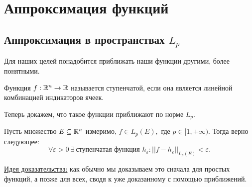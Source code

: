 \section{Аппроксимация функций}
\subsection{Аппроксимация в пространствах $L_p$}
Для наших целей понадобится приближать наши функции другими, более понятными.

\begin{definition}
    Функция $f : \mathbb{R}^{n} \rightarrow \mathbb{R}$ называется ступенчатой, если она является линейной комбинацией индикаторов ячеек.
\end{definition}

Теперь докажем, что такое функции приближают по норме $L_p$.

\begin{theorem}
    Пусть множество $E \subseteq \mathbb{R}^n$ измеримо, $f \in L_p(E), $ где $p \in [1, +\infty)$.
    Тогда верно следующее:
    $$\forall \varepsilon > 0 \ \exists \ \text{ступенчатая функция } h_{\varepsilon} : ||f - h_{\varepsilon}||_{L_p(E)} < \varepsilon.$$
\end{theorem}

\underline{Идея доказательства:} как обычно мы доказываем это сначала для простых функций, а позже для всех, сводя к уже доказанному с помощью приближений.

